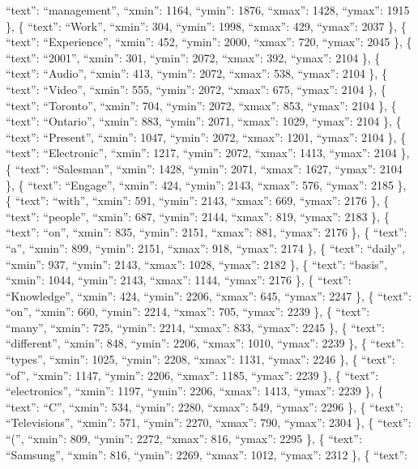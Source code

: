 \documentclass[
]{article}
\begin{document}
``text'': ``management'', ``xmin'': 1164, ``ymin'': 1876, ``xmax'':
1428, ``ymax'': 1915 \}, \{ ``text'': ``Work'', ``xmin'': 304, ``ymin'':
1998, ``xmax'': 429, ``ymax'': 2037 \}, \{ ``text'': ``Experience'',
``xmin'': 452, ``ymin'': 2000, ``xmax'': 720, ``ymax'': 2045 \}, \{
``text'': ``2001'', ``xmin'': 301, ``ymin'': 2072, ``xmax'': 392,
``ymax'': 2104 \}, \{ ``text'': ``Audio'', ``xmin'': 413, ``ymin'':
2072, ``xmax'': 538, ``ymax'': 2104 \}, \{ ``text'': ``Video'',
``xmin'': 555, ``ymin'': 2072, ``xmax'': 675, ``ymax'': 2104 \}, \{
``text'': ``Toronto'', ``xmin'': 704, ``ymin'': 2072, ``xmax'': 853,
``ymax'': 2104 \}, \{ ``text'': ``Ontario'', ``xmin'': 883, ``ymin'':
2071, ``xmax'': 1029, ``ymax'': 2104 \}, \{ ``text'': ``Present'',
``xmin'': 1047, ``ymin'': 2072, ``xmax'': 1201, ``ymax'': 2104 \}, \{
``text'': ``Electronic'', ``xmin'': 1217, ``ymin'': 2072, ``xmax'':
1413, ``ymax'': 2104 \}, \{ ``text'': ``Salesman'', ``xmin'': 1428,
``ymin'': 2071, ``xmax'': 1627, ``ymax'': 2104 \}, \{ ``text'':
``Engage'', ``xmin'': 424, ``ymin'': 2143, ``xmax'': 576, ``ymax'': 2185
\}, \{ ``text'': ``with'', ``xmin'': 591, ``ymin'': 2143, ``xmax'': 669,
``ymax'': 2176 \}, \{ ``text'': ``people'', ``xmin'': 687, ``ymin'':
2144, ``xmax'': 819, ``ymax'': 2183 \}, \{ ``text'': ``on'', ``xmin'':
835, ``ymin'': 2151, ``xmax'': 881, ``ymax'': 2176 \}, \{ ``text'':
``a'', ``xmin'': 899, ``ymin'': 2151, ``xmax'': 918, ``ymax'': 2174 \},
\{ ``text'': ``daily'', ``xmin'': 937, ``ymin'': 2143, ``xmax'': 1028,
``ymax'': 2182 \}, \{ ``text'': ``basis'', ``xmin'': 1044, ``ymin'':
2143, ``xmax'': 1144, ``ymax'': 2176 \}, \{ ``text'': ``Knowledge'',
``xmin'': 424, ``ymin'': 2206, ``xmax'': 645, ``ymax'': 2247 \}, \{
``text'': ``on'', ``xmin'': 660, ``ymin'': 2214, ``xmax'': 705,
``ymax'': 2239 \}, \{ ``text'': ``many'', ``xmin'': 725, ``ymin'': 2214,
``xmax'': 833, ``ymax'': 2245 \}, \{ ``text'': ``different'', ``xmin'':
848, ``ymin'': 2206, ``xmax'': 1010, ``ymax'': 2239 \}, \{ ``text'':
``types'', ``xmin'': 1025, ``ymin'': 2208, ``xmax'': 1131, ``ymax'':
2246 \}, \{ ``text'': ``of'', ``xmin'': 1147, ``ymin'': 2206, ``xmax'':
1185, ``ymax'': 2239 \}, \{ ``text'': ``electronics'', ``xmin'': 1197,
``ymin'': 2206, ``xmax'': 1413, ``ymax'': 2239 \}, \{ ``text'': ``C'',
``xmin'': 534, ``ymin'': 2280, ``xmax'': 549, ``ymax'': 2296 \}, \{
``text'': ``Televisions'', ``xmin'': 571, ``ymin'': 2270, ``xmax'': 790,
``ymax'': 2304 \}, \{ ``text'': ``('', ``xmin'': 809, ``ymin'': 2272,
``xmax'': 816, ``ymax'': 2295 \}, \{ ``text'': ``Samsung'', ``xmin'':
816, ``ymin'': 2269, ``xmax'': 1012, ``ymax'': 2312 \}, \{ ``text'':
\end{document}
